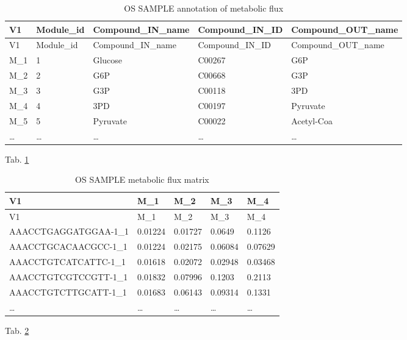 \documentclass[
]{article}
\begin{document}
\begin{longtable}[]{@{}lllll@{}}
\caption{\label{tab:OS-SAMPLE-annotation-of-metabolic-flux}OS SAMPLE annotation of metabolic flux}\tabularnewline
\toprule
V1 & Module\_id & Compound\_IN\_name & Compound\_IN\_ID & Compound\_OUT\_name\tabularnewline
\midrule
\endfirsthead
\toprule
V1 & Module\_id & Compound\_IN\_name & Compound\_IN\_ID & Compound\_OUT\_name\tabularnewline
\midrule
\endhead
M\_1 & 1 & Glucose & C00267 & G6P\tabularnewline
M\_2 & 2 & G6P & C00668 & G3P\tabularnewline
M\_3 & 3 & G3P & C00118 & 3PD\tabularnewline
M\_4 & 4 & 3PD & C00197 & Pyruvate\tabularnewline
M\_5 & 5 & Pyruvate & C00022 & Acetyl-Coa\tabularnewline
\ldots{} & \ldots{} & \ldots{} & \ldots{} & \ldots{}\tabularnewline
\bottomrule
\end{longtable}

\begin{center}\vspace{1.5cm}\end{center}

Tab. \ref{tab:OS-SAMPLE-annotation-of-metabolic-flux}

\begin{center}\vspace{1.5cm}\end{center}

\begin{longtable}[]{@{}lllll@{}}
\caption{\label{tab:OS-SAMPLE-metabolic-flux-matrix}OS SAMPLE metabolic flux matrix}\tabularnewline
\toprule
V1 & M\_1 & M\_2 & M\_3 & M\_4\tabularnewline
\midrule
\endfirsthead
\toprule
V1 & M\_1 & M\_2 & M\_3 & M\_4\tabularnewline
\midrule
\endhead
AAACCTGAGGATGGAA-1\_1 & 0.01224 & 0.01727 & 0.0649 & 0.1126\tabularnewline
AAACCTGCACAACGCC-1\_1 & 0.01224 & 0.02175 & 0.06084 & 0.07629\tabularnewline
AAACCTGTCATCATTC-1\_1 & 0.01618 & 0.02072 & 0.02948 & 0.03468\tabularnewline
AAACCTGTCGTCCGTT-1\_1 & 0.01832 & 0.07996 & 0.1203 & 0.2113\tabularnewline
AAACCTGTCTTGCATT-1\_1 & 0.01683 & 0.06143 & 0.09314 & 0.1331\tabularnewline
\ldots{} & \ldots{} & \ldots{} & \ldots{} & \ldots{}\tabularnewline
\bottomrule
\end{longtable}

\begin{center}\vspace{1.5cm}\end{center}

Tab. \ref{tab:OS-SAMPLE-metabolic-flux-matrix}
\end{document}
